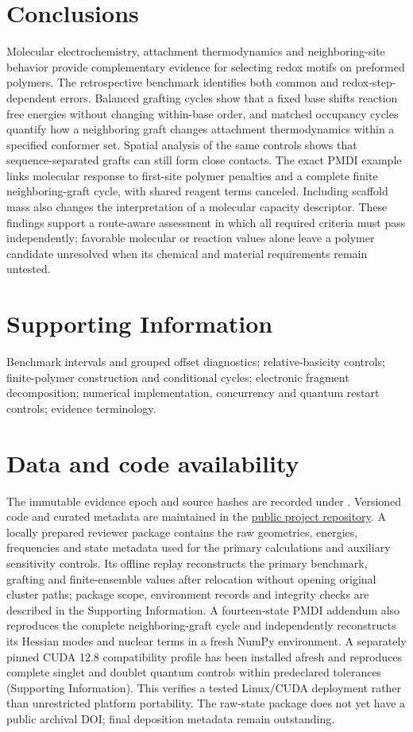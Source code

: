 \documentclass[11pt]{article}
\begin{document}
\section{Conclusions}
Molecular electrochemistry, attachment thermodynamics and neighboring-site behavior provide complementary evidence for selecting redox motifs on preformed polymers. The retrospective benchmark identifies both common and redox-step-dependent errors. Balanced grafting cycles show that a fixed base shifts reaction free energies without changing within-base order, and matched occupancy cycles quantify how a neighboring graft changes attachment thermodynamics within a specified conformer set. Spatial analysis of the same controls shows that sequence-separated grafts can still form close contacts. The exact PMDI example links molecular response to first-site polymer penalties and a complete finite neighboring-graft cycle, with shared reagent terms canceled. Including scaffold mass also changes the interpretation of a molecular capacity descriptor. These findings support a route-aware assessment in which all required criteria must pass independently; favorable molecular or reaction values alone leave a polymer candidate unresolved when its chemical and material requirements remain untested.

\section*{Supporting Information}
Benchmark intervals and grouped offset diagnostics; relative-basicity controls; finite-polymer construction and conditional cycles; electronic fragment decomposition; numerical implementation, concurrency and quantum restart controls; evidence terminology.
\section*{Data and code availability}
The immutable evidence epoch and source hashes are recorded under . Versioned code and curated metadata are maintained in the \href{https://github.com/Ray16/RTFB-materials-research}{public project repository}. A locally prepared reviewer package contains the raw geometries, energies, frequencies and state metadata used for the primary calculations and auxiliary sensitivity controls. Its offline replay reconstructs the primary benchmark, grafting and finite-ensemble values after relocation without opening original cluster paths; package scope, environment records and integrity checks are described in the Supporting Information. A fourteen-state PMDI addendum also reproduces the complete neighboring-graft cycle and independently reconstructs its Hessian modes and nuclear terms in a fresh NumPy environment. A separately pinned CUDA 12.8 compatibility profile has been installed afresh and reproduces complete singlet and doublet quantum controls within predeclared tolerances (Supporting Information). This verifies a tested Linux/CUDA deployment rather than unrestricted platform portability. The raw-state package does not yet have a public archival DOI; final deposition metadata remain outstanding.
\end{document}

